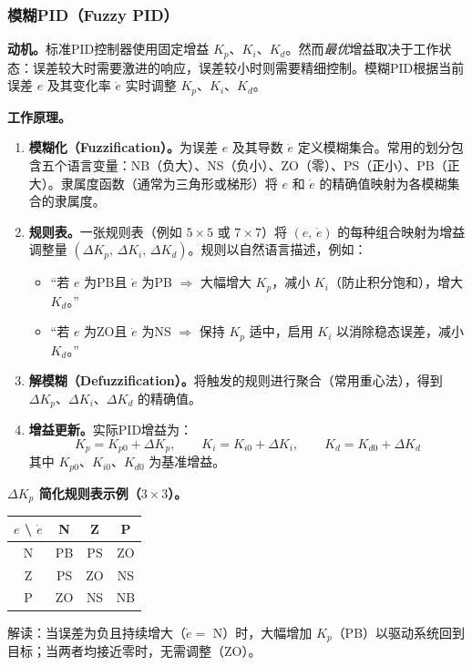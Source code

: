 \subsubsection{模糊PID（Fuzzy PID）}

\textbf{动机。}标准PID控制器使用固定增益 $K_p$、$K_i$、$K_d$。然而\emph{最优}增益取决于工作状态：误差较大时需要激进的响应，误差较小时则需要精细控制。模糊PID根据当前误差 $e$ 及其变化率 $\dot{e}$ 实时调整 $K_p$、$K_i$、$K_d$。

\textbf{工作原理。}
\begin{enumerate}
    \item \textbf{模糊化（Fuzzification）。}为误差 $e$ 及其导数 $\dot{e}$ 定义模糊集合。常用的划分包含五个语言变量：NB（负大）、NS（负小）、ZO（零）、PS（正小）、PB（正大）。隶属度函数（通常为三角形或梯形）将 $e$ 和 $\dot{e}$ 的精确值映射为各模糊集合的隶属度。
    \item \textbf{规则表。}一张规则表（例如 $5 \times 5$ 或 $7 \times 7$）将 $(e,\, \dot{e})$ 的每种组合映射为增益调整量 $(\Delta K_p,\, \Delta K_i,\, \Delta K_d)$。规则以自然语言描述，例如：
    \begin{itemize}
        \item ``若 $e$ 为PB且 $\dot{e}$ 为PB $\Rightarrow$ 大幅增大 $K_p$，减小 $K_i$（防止积分饱和），增大 $K_d$。''
        \item ``若 $e$ 为ZO且 $\dot{e}$ 为NS $\Rightarrow$ 保持 $K_p$ 适中，启用 $K_i$ 以消除稳态误差，减小 $K_d$。''
    \end{itemize}
    \item \textbf{解模糊（Defuzzification）。}将触发的规则进行聚合（常用重心法），得到 $\Delta K_p$、$\Delta K_i$、$\Delta K_d$ 的精确值。
    \item \textbf{增益更新。}实际PID增益为：
    \[
        K_p = K_{p0} + \Delta K_p, \qquad K_i = K_{i0} + \Delta K_i, \qquad K_d = K_{d0} + \Delta K_d
    \]
    其中 $K_{p0}$、$K_{i0}$、$K_{d0}$ 为基准增益。
\end{enumerate}

\textbf{$\Delta K_p$ 简化规则表示例（$3 \times 3$）。}
\begin{center}
\begin{tabular}{c|ccc}
    $e$ \textbackslash{} $\dot{e}$ & N & Z & P \\
    \hline
    N & PB & PS & ZO \\
    Z & PS & ZO & NS \\
    P & ZO & NS & NB \\
\end{tabular}
\end{center}
解读：当误差为负且持续增大（$\dot{e} = $ N）时，大幅增加 $K_p$（PB）以驱动系统回到目标；当两者均接近零时，无需调整（ZO）。

